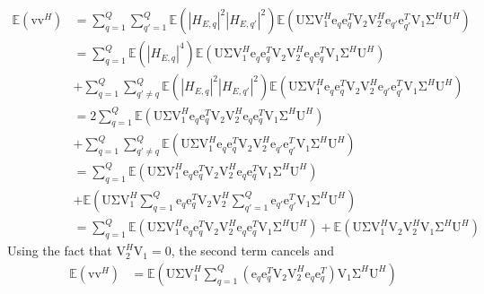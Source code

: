 \documentclass[12pt]{article}
\newcommand{\vect}[1]{\boldsymbol{\mathrm{#1}}}
\newcommand{\mat}[1]{\boldsymbol{\mathrm{#1}}}
\begin{document}
\begin{align*}
\mathbb{E}\left(\vect{v}\vect{v}^H\right)&=\sum_{q=1}^Q\sum_{q'=1}^Q\mathbb{E}(|H_{E,q}|^2|H_{E,q'}|^2)\mathbb{E}\left(\mat{U} \mat{\Sigma}\mat{V}_1^H  \vect{e}_q \vect{e}_q^T \mat{V}_2 \mat{V}_2^H \vect{e}_{q'} \vect{e}_{q'}^T\mat{V}_1 \mat{\Sigma}^H   \mat{U}^H\right)\\
&=\sum_{q=1}^Q\mathbb{E}(|H_{E,q}|^4)\mathbb{E}\left(\mat{U} \mat{\Sigma}\mat{V}_1^H  \vect{e}_q \vect{e}_q^T \mat{V}_2 \mat{V}_2^H \vect{e}_{q} \vect{e}_{q}^T\mat{V}_1 \mat{\Sigma}^H   \mat{U}^H\right)\\
&+\sum_{q=1}^Q\sum_{q'\neq q}^Q\mathbb{E}(|H_{E,q}|^2|H_{E,q'}|^2)\mathbb{E}\left(\mat{U} \mat{\Sigma}\mat{V}_1^H  \vect{e}_q \vect{e}_q^T \mat{V}_2 \mat{V}_2^H \vect{e}_{q'} \vect{e}_{q'}^T\mat{V}_1 \mat{\Sigma}^H   \mat{U}^H\right)\\
&=2\sum_{q=1}^Q\mathbb{E}\left(\mat{U} \mat{\Sigma}\mat{V}_1^H  \vect{e}_q \vect{e}_q^T \mat{V}_2 \mat{V}_2^H \vect{e}_{q} \vect{e}_{q}^T\mat{V}_1 \mat{\Sigma}^H   \mat{U}^H\right)\\
&+\sum_{q=1}^Q\sum_{q'\neq q}^Q\mathbb{E}\left(\mat{U} \mat{\Sigma}\mat{V}_1^H  \vect{e}_q \vect{e}_q^T \mat{V}_2 \mat{V}_2^H \vect{e}_{q'} \vect{e}_{q'}^T\mat{V}_1 \mat{\Sigma}^H   \mat{U}^H\right)\\
&=\sum_{q=1}^Q\mathbb{E}\left(\mat{U} \mat{\Sigma}\mat{V}_1^H  \vect{e}_q \vect{e}_q^T \mat{V}_2 \mat{V}_2^H \vect{e}_{q} \vect{e}_{q}^T\mat{V}_1 \mat{\Sigma}^H   \mat{U}^H\right)\\
&+\mathbb{E}\left(\mat{U} \mat{\Sigma}\mat{V}_1^H \sum_{q=1}^Q \vect{e}_q \vect{e}_q^T \mat{V}_2 \mat{V}_2^H \sum_{q'=1}^Q\vect{e}_{q'} \vect{e}_{q'}^T\mat{V}_1 \mat{\Sigma}^H   \mat{U}^H\right)\\
&=\sum_{q=1}^Q\mathbb{E}\left(\mat{U} \mat{\Sigma}\mat{V}_1^H  \vect{e}_q \vect{e}_q^T \mat{V}_2 \mat{V}_2^H \vect{e}_{q} \vect{e}_{q}^T\mat{V}_1 \mat{\Sigma}^H   \mat{U}^H\right)+\mathbb{E}\left(\mat{U} \mat{\Sigma}\mat{V}_1^H  \mat{V}_2 \mat{V}_2^H \mat{V}_1 \mat{\Sigma}^H   \mat{U}^H\right)
\end{align*}
Using the fact that $\mat{V}_2^H \mat{V}_1=\mat{0}$, the second term cancels and
\begin{align*}
\mathbb{E}\left(\vect{v}\vect{v}^H\right)&=\mathbb{E}\left(\mat{U} \mat{\Sigma}\mat{V}_1^H  \sum_{q=1}^Q\left(\vect{e}_q \vect{e}_q^T \mat{V}_2 \mat{V}_2^H \vect{e}_{q} \vect{e}_{q}^T\right)\mat{V}_1 \mat{\Sigma}^H   \mat{U}^H\right)
\end{align*}
\end{document}
